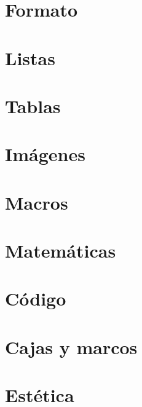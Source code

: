 \documentclass[11pt,twoside,titlepage,a4paper]{article}
\theoremstyle{ejemplo}
\theoremstyle{nota}
\begin{document}

\newpage
\section{Formato}


\newpage
\section{Listas}


\newpage
\section{Tablas}


\newpage
\section{Imágenes}


\newpage
\section{Macros}


\newpage
\section{Matemáticas}


\newpage
\section{Código}


\newpage
\section{Cajas y marcos}


\newpage
\section{Estética}
\end{document}
